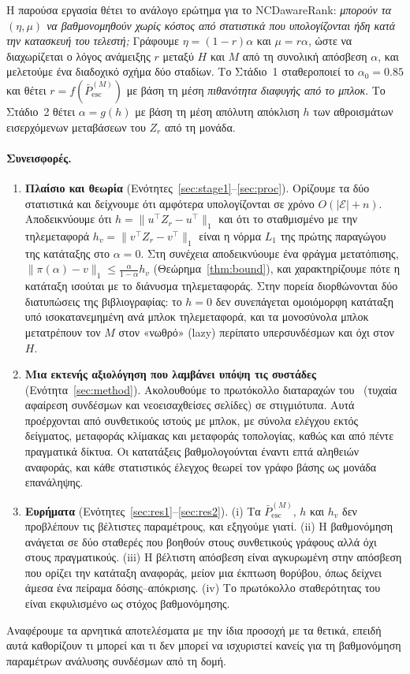 \documentclass[11pt,a4paper]{article}
\theoremstyle{definition}
\theoremstyle{remark}
\newcommand{\Pbar}{\bar P^{(M)}_{\mathrm{esc}}}
\begin{document}
Η παρούσα εργασία θέτει το ανάλογο ερώτημα για το NCDawareRank: \emph{μπορούν τα $(\eta,\mu)$ να
βαθμονομηθούν χωρίς κόστος από στατιστικά που υπολογίζονται ήδη κατά την κατασκευή του τελεστή;}
Γράφουμε $\eta=(1-r)\alpha$ και $\mu=r\alpha$, ώστε να διαχωρίζεται ο λόγος ανάμειξης $r$ μεταξύ $H$
και $M$ από τη συνολική απόσβεση $\alpha$, και μελετούμε ένα διαδοχικό σχήμα δύο σταδίων. Το Στάδιο~1
σταθεροποιεί το $\alpha_0=0.85$ και θέτει $r=f(\Pbar)$ με βάση τη μέση \emph{πιθανότητα διαφυγής από
το μπλοκ}. Το Στάδιο~2 θέτει $\alpha=g(h)$ με βάση τη μέση απόλυτη απόκλιση $h$ των αθροισμάτων
εισερχόμενων μεταβάσεων του $Z_r$ από τη μονάδα.

\paragraph{Συνεισφορές.}
\begin{enumerate}[leftmargin=1.4em,itemsep=2pt]
\item \textbf{Πλαίσιο και θεωρία} (Ενότητες~\ref{sec:stage1}--\ref{sec:proc}). Ορίζουμε τα δύο
στατιστικά και δείχνουμε ότι αμφότερα υπολογίζονται σε χρόνο $O(|\mathcal E|+n)$. Αποδεικνύουμε ότι
$h=\|u^\top Z_r-u^\top\|_1$ και ότι το σταθμισμένο με την τηλεμεταφορά $h_v=\|v^\top Z_r-v^\top\|_1$
είναι η νόρμα $L_1$ της πρώτης παραγώγου της κατάταξης στο $\alpha=0$. Στη συνέχεια αποδεικνύουμε ένα
φράγμα μετατόπισης, $\|\pi(\alpha)-v\|_1\le\frac{\alpha}{1-\alpha}h_v$ (Θεώρημα~\ref{thm:bound}), και
χαρακτηρίζουμε πότε η κατάταξη ισούται με το διάνυσμα τηλεμεταφοράς. Στην πορεία διορθώνονται δύο
διατυπώσεις της βιβλιογραφίας: το $h=0$ δεν συνεπάγεται ομοιόμορφη κατάταξη υπό ισοκατανεμημένη ανά
μπλοκ τηλεμεταφορά, και τα μονοσύνολα μπλοκ μετατρέπουν τον $M$ στον «νωθρό» (lazy) περίπατο
υπερσυνδέσμων και όχι στον $H$.
\item \textbf{Μια εκτενής αξιολόγηση που λαμβάνει υπόψη τις συστάδες} (Ενότητα~\ref{sec:method}).
Ακολουθούμε το πρωτόκολλο διαταραχών του~\cite{ng13} (τυχαία αφαίρεση συνδέσμων και νεοεισαχθείσες
σελίδες) σε \nInstTotal{} στιγμιότυπα. Αυτά προέρχονται από συνθετικούς ιστούς με μπλοκ, με σύνολα
ελέγχου εκτός δείγματος, μεταφοράς κλίμακας και μεταφοράς τοπολογίας, καθώς και από πέντε πραγματικά
δίκτυα. Οι κατατάξεις βαθμολογούνται έναντι επτά αληθειών αναφοράς, και κάθε στατιστικός έλεγχος
θεωρεί τον γράφο βάσης ως μονάδα επανάληψης.
\item \textbf{Ευρήματα} (Ενότητες~\ref{sec:res1}--\ref{sec:res2}). (i) Τα $\Pbar$, $h$ και $h_v$ δεν
προβλέπουν τις βέλτιστες παραμέτρους, και εξηγούμε γιατί. (ii) Η βαθμονόμηση ανάγεται σε δύο σταθερές
που βοηθούν στους συνθετικούς γράφους αλλά όχι στους πραγματικούς. (iii) Η βέλτιστη απόσβεση είναι
αγκυρωμένη στην απόσβεση που ορίζει την κατάταξη αναφοράς, μείον μια έκπτωση θορύβου, όπως δείχνει
άμεσα ένα πείραμα δόσης--απόκρισης. (iv) Το πρωτόκολλο σταθερότητας του~\cite{ng13} είναι
εκφυλισμένο ως στόχος βαθμονόμησης.
\end{enumerate}
Αναφέρουμε τα αρνητικά αποτελέσματα με την ίδια προσοχή με τα θετικά, επειδή αυτά καθορίζουν τι μπορεί
και τι δεν μπορεί να ισχυριστεί κανείς για τη βαθμονόμηση παραμέτρων ανάλυσης συνδέσμων από τη δομή.
\end{document}
